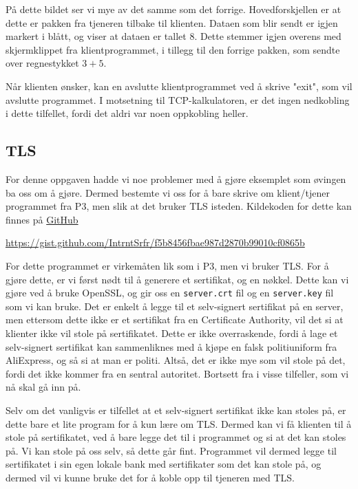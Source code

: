 \documentclass[12pt]{article}
\begin{document}
    På dette bildet ser vi mye av det samme som det forrige. Hovedforskjellen er at dette er 
    pakken fra tjeneren tilbake til klienten. Dataen som blir sendt er igjen markert i blått, og 
    viser at dataen er tallet 8. Dette stemmer igjen overens med skjermklippet fra klientprogrammet,
    i tillegg til den forrige pakken, som sendte over regnestykket $3+5$. 

    Når klienten ønsker, kan en avslutte klientprogrammet ved å skrive "exit", som vil avslutte 
    programmet. I motsetning til TCP-kalkulatoren, er det ingen nedkobling i dette tilfellet, fordi 
    det aldri var noen oppkobling heller. 

    
    \subsection{TLS}
    For denne oppgaven hadde vi noe problemer med å gjøre eksemplet som øvingen ba oss om å gjøre. 
    Dermed bestemte vi oss for å bare skrive om klient/tjener programmet fra P3, men slik at det 
    bruker TLS isteden. Kildekoden for dette kan finnes på \href{https://gist.github.com/IntrntSrfr/f5b8456fbae987d2870b99010cf0865b}{GitHub}

    \url{https://gist.github.com/IntrntSrfr/f5b8456fbae987d2870b99010cf0865b}

    For dette programmet er virkemåten lik som i P3, men vi bruker TLS. For å gjøre dette, er vi 
    først nødt til å generere et sertifikat, og en nøkkel. Dette kan vi gjøre ved å bruke OpenSSL,
    og gir oss en \verb|server.crt| fil og en \verb|server.key| fil som vi kan bruke. Det er enkelt 
    å legge til et selv-signert sertifikat på en server, men ettersom dette ikke er et sertifikat fra
    en Certificate Authority, vil det si at klienter ikke vil stole på sertifikatet. Dette 
    er ikke overraskende, fordi å lage et selv-signert sertifikat kan sammenliknes med å kjøpe en 
    falsk politiuniform fra AliExpress, og så si at man er politi. Altså, det er ikke 
    mye som vil stole på det, fordi det ikke kommer fra en sentral autoritet. Bortsett fra i 
    visse tilfeller, som vi nå skal gå inn på. 

    Selv om det vanligvis er tilfellet at et selv-signert sertifikat ikke kan stoles på, er
    dette bare et lite program for å kun lære om TLS.
    Dermed kan vi få klienten til å stole på sertifikatet, ved å bare legge det til i programmet
    og si at det kan stoles på. Vi kan stole på oss selv, så dette går fint. Programmet vil 
    dermed legge til sertifikatet i sin egen lokale bank med sertifikater som det kan stole på, 
    og dermed vil vi kunne bruke det for å koble opp til tjeneren med TLS.
\end{document}
